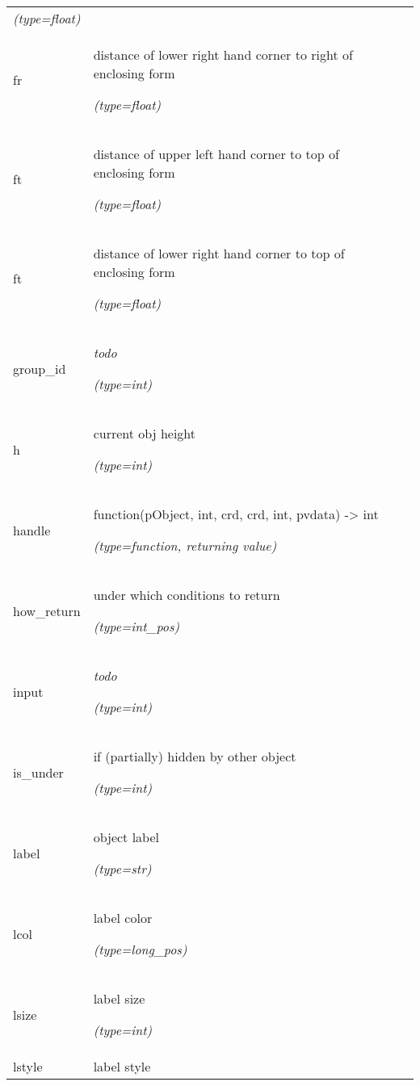 \begin{longtable}{|p{\varnamewidth}|p{\vardescrwidth}|l}
            {\it (type=float)}&\\
\cline{1-2}
\raggedright f\-r\-2\- & \raggedright distance of lower right hand corner to right of enclosing form

            {\it (type=float)}&\\
\cline{1-2}
\raggedright f\-t\-1\- & \raggedright distance of upper left hand corner to top of enclosing form

            {\it (type=float)}&\\
\cline{1-2}
\raggedright f\-t\-2\- & \raggedright distance of lower right hand corner to top of enclosing form

            {\it (type=float)}&\\
\cline{1-2}
\raggedright g\-r\-o\-u\-p\-\_\-i\-d\- & \raggedright \emph{todo}

            {\it (type=int)}&\\
\cline{1-2}
\raggedright h\- & \raggedright current obj height

            {\it (type=int)}&\\
\cline{1-2}
\raggedright h\-a\-n\-d\-l\-e\- & \raggedright function(pObject, int, crd, crd, int, pvdata) -> int

            {\it (type=function, returning value)}&\\
\cline{1-2}
\raggedright h\-o\-w\-\_\-r\-e\-t\-u\-r\-n\- & \raggedright under which conditions to return

            {\it (type=int\_pos)}&\\
\cline{1-2}
\raggedright i\-n\-p\-u\-t\- & \raggedright \emph{todo}

            {\it (type=int)}&\\
\cline{1-2}
\raggedright i\-s\-\_\-u\-n\-d\-e\-r\- & \raggedright if (partially) hidden by other object

            {\it (type=int)}&\\
\cline{1-2}
\raggedright l\-a\-b\-e\-l\- & \raggedright object label

            {\it (type=str)}&\\
\cline{1-2}
\raggedright l\-c\-o\-l\- & \raggedright label color

            {\it (type=long\_pos)}&\\
\cline{1-2}
\raggedright l\-s\-i\-z\-e\- & \raggedright label size

            {\it (type=int)}&\\
\cline{1-2}
\raggedright l\-s\-t\-y\-l\-e\- & \raggedright label style


\end{longtable}
